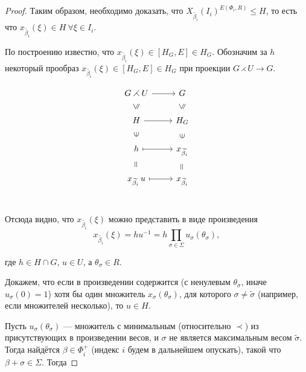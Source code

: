 \documentclass[15pt]{article}
\theoremstyle{remark}
\renewcommand{\le}{\leqslant}
\begin{document}
\begin{proof}
Таким образом, необходимо доказать, что $X_{\widetilde{\beta_i}}(I_i)^{E(\Phi_i,R)} \le H$, то есть что
$x_{\widetilde{\beta_i}}(\xi) \in H \ \forall \xi \in I_i$.

По построению известно, что $x_{\widetilde{\beta_i}}(\xi) \in [H_G,E] \in H_G$.
Обозначим за $h$ некоторый прообраз $x_{\widetilde{\beta_i}}(\xi) \in [H_G,E] \in H_G$ при проекции $G \rightthreetimes U \rightarrow G$.

\begin{equation*}
\tikzset{
  Subgroup/.style={
    draw=none,
    every to/.append style={
      edge node={node [sloped, allow upside down, auto=false]{$\le$}}}},
  Equals/.style={
    draw=none,
    every to/.append style={
      edge node={node [sloped, allow upside down, auto=false]{$=$}}}},
  Included/.style={
    draw=none,
    every to/.append style={
      edge node={node [sloped, allow upside down, auto=false]{$\in$}}}}
}
\begin{tikzcd}
G \rightthreetimes U \arrow{r}{} & G \\
H \arrow[Subgroup]{u} \arrow{r}{} & H_G \arrow[Subgroup]{u} \\
h \arrow[Included]{u} \arrow[maps to]{r}{} & x_{\widetilde{\beta_i}} \arrow[Included]{u} \\
x_{\widetilde{\beta_i}}\,u \arrow[Equals]{u} \arrow[maps to]{r}{} & x_{\widetilde{\beta_i}} \arrow[Equals]{u} \\
\end{tikzcd}
\end{equation*}

Отсюда видно, что $x_{\widetilde{\beta_i}}(\xi)$ можно представить в виде произведения $$x_{\widetilde{\beta_i}}(\xi) = h u^{-1} = h \prod_{\sigma \in \Sigma} u_\sigma(\theta_\sigma),$$

где $h\in H\cap G$, $u \in U$, а $\theta_\sigma \in R$.

Докажем, что если в произведении содержится (с ненулевым $\theta_\sigma$, иначе $u_\sigma(0)=1$) хотя бы один множитель $x_\sigma(\theta_\sigma)$, для которого $\sigma \ne \widetilde\sigma$ (например, если множителей несколько), то $u \in H$.%


Пусть $u_\sigma(\theta_\sigma)$ --- множитель с минимальным (относительно $\prec$) из присутствующих в произведении весов, и $\sigma$ не является максимальным весом $\widetilde{\sigma}$. Тогда найдётся $\beta \in \Phi_i^+$ (индекс $i$ будем в дальнейшем опускать), такой что $\beta+\sigma \in \Sigma$. Тогда


\end{proof}
\end{document}
